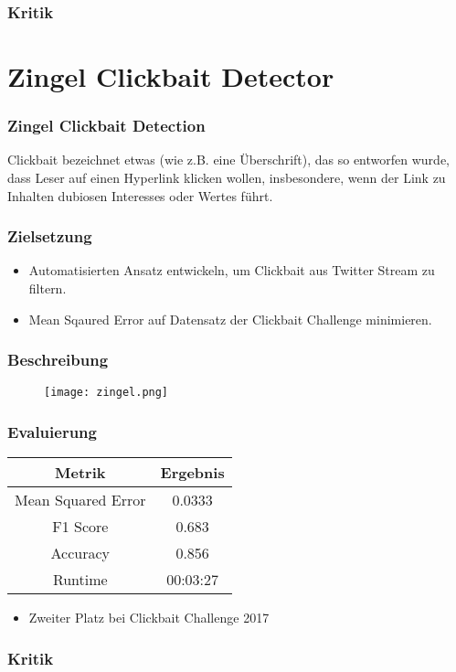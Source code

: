 \documentclass{beamer}
\begin{document}
\begin{frame}
    \frametitle{Kritik}
    \begin{itemize}
	\end{itemize}
\end{frame}

\section{Zingel Clickbait Detector}
\begin{frame}
\frametitle{Zingel Clickbait Detection}
    \begin{definition}
	Clickbait bezeichnet etwas (wie z.B. eine Überschrift), das so entworfen wurde, dass Leser auf einen Hyperlink klicken wollen,
	insbesondere, wenn der Link zu Inhalten dubiosen Interesses oder Wertes führt.
	\end{definition}
\end{frame}
\begin{frame}
    \frametitle{Zielsetzung}
	\begin{itemize}    
	\item Automatisierten Ansatz entwickeln, um Clickbait aus Twitter Stream zu filtern.
	\item Mean Sqaured Error auf Datensatz der Clickbait Challenge minimieren.
	\end{itemize}
\end{frame}
\begin{frame}
    \frametitle{Beschreibung}
    \begin{figure}
  	\texttt{[image: zingel.png]}
\end{figure}
\end{frame}
\begin{frame}
    \frametitle{Evaluierung}
    \center
    \begin{tabular}{c|c}
    Metrik & Ergebnis \\ \hline 
    Mean Squared Error & 0.0333 \\
	F1 Score & 0.683 \\
	Accuracy & 0.856 \\
	Runtime & 00:03:27 \\
    \end{tabular}
	
	\begin{itemize}
	\item Zweiter Platz bei Clickbait Challenge 2017
	\end{itemize}
\end{frame}
\begin{frame}
    \frametitle{Kritik}
    \begin{itemize}
	\end{itemize}
\end{frame}
\end{document}
